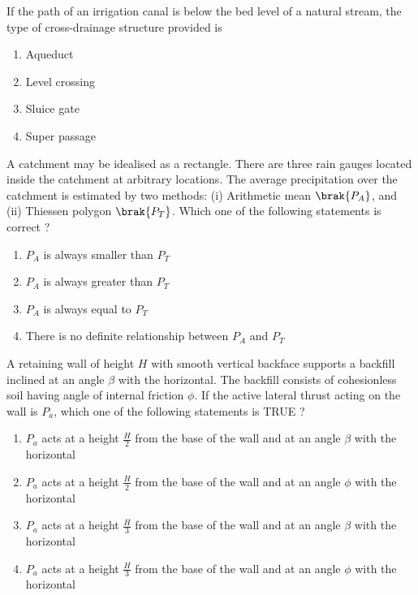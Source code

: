 \item If the path of an irrigation canal is below the bed level of a natural stream, the type of cross-drainage structure provided is
\begin{enumerate}
    \item Aqueduct
    \item Level crossing
    \item Sluice gate
    \item Super passage \\
\end{enumerate}
\item A catchment may be idealised as a rectangle. There are three rain gauges located inside the catchment at arbitrary locations. The average precipitation over the catchment is estimated by two methods: (i) Arithmetic mean $\brak{P_A}$, and (ii) Thiessen polygon $\brak{P_T}$. Which one of the
following statements is correct ?
\begin{enumerate}
    \item $P_A$ is always smaller than $P_T$
    \item $P_A$ is always greater than $P_T$
    \item $P_A$ is always equal to $P_T$
    \item There is no definite relationship between $P_A$ and $P_T$ \\
\end{enumerate}
\item A retaining wall of height $H$ with smooth vertical backface supports a backfill inclined at an angle $\beta$ with the horizontal. The backfill consists of cohesionless soil having angle of internal friction $\phi$. If the active lateral thrust acting on the wall is $P_a$, which one of the following statements is TRUE ?
\begin{enumerate}
    \item $P_a$ acts at a height $\frac{H}{2}$ from the base of the wall and at an angle $\beta$ with the horizontal
    \item $P_a$ acts at a height $\frac{H}{2}$ from the base of the wall and at an angle $\phi$ with the horizontal
    \item $P_a$ acts at a height $\frac{H}{3}$ from the base of the wall and at an angle $\beta$ with the horizontal
    \item $P_a$ acts at a height $\frac{H}{3}$ from the base of the wall and at an angle $\phi$ with the horizontal \\
\end{enumerate}
